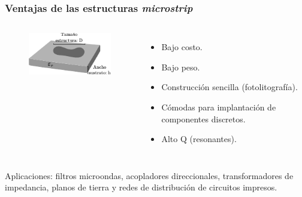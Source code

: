 \documentclass{beamer}
\begin{document}
		\begin{frame}
		\frametitle{Ventajas de las estructuras \textit{microstrip}}
		
		\begin{columns}[c] %
			
			\begin{figure}[h]
				\centering
				\includegraphics[width=1\textwidth]{Presentacion/microstrip_general.pdf}
			\end{figure}
			
			\begin{itemize}
				\item Bajo costo.
				\item Bajo peso.
				\item Construcción sencilla (fotolitografía).
				\item Cómodas para implantación de componentes discretos.
				\item Alto Q (resonantes).
			\end{itemize}
		
		\end{columns}
	
	\vspace{25pt}
	
	Aplicaciones: filtros microondas, acopladores direccionales, transformadores de impedancia, planos de tierra y redes de distribución de circuitos impresos.
		
	\end{frame}
		
\end{document}
